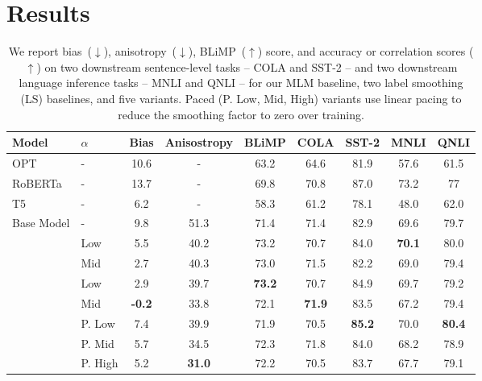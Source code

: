 \section{Results}
\label{sec:results}

\begin{table}[ht!]
    \centering
    \small
    \setlength{\tabcolsep}{4pt}  %
    \begin{tabular}{ll||cc|ccccc}
    \toprule
    \textbf{Model}  & $\alpha$ & \textbf{Bias}  & \textbf{Anisostropy} & \textbf{BLiMP} & \textbf{COLA} & \textbf{SST-2} & \textbf{MNLI} & \textbf{QNLI}  \\
    \midrule
    OPT   & - & 10.6 & - & 63.2 & 64.6 & 81.9 & 57.6 & 61.5\\
    RoBERTa & - & 13.7 & - & 69.8 & 70.8 & 87.0 & 73.2 & 77\\
    T5      & - & 6.2 & - & 58.3 & 61.2 & 78.1 & 48.0 &  62.0\\
    \midrule
    \midrule
    Base Model & -&9.8 & 51.3 & 71.4 & 71.4 & 82.9 & 69.6 & 79.7 \\
    \midrule
     &Low & 5.5 & 40.2 & 73.2 & 70.7 & 84.0 & \textbf{70.1} & 80.0 \\
    &Mid & 2.7  & 40.3 & 73.0 & 71.5 & 82.2 & 69.0 & 79.4 \\
    \midrule
    &Low  & 2.9 & 39.7 & \textbf{73.2} & 70.7 & 84.9 & 69.7 & 79.2 \\
    &Mid  & \textbf{-0.2} & 33.8 & 72.1 & \textbf{71.9} & 83.5 & 67.2 & 79.4 \\
    &P. Low & 7.4 & 39.9 & 71.9 & 70.5 & \textbf{85.2} & 70.0 & \textbf{80.4}\\ 
    &P. Mid& 5.7 & 34.5 & 72.3 & 71.8 & 84.0 & 68.2 & 78.9\\ 
    &P. High & 5.2 & \textbf{31.0} & 72.2 & 70.5 & 83.7 & 67.7 & 79.1 \\ 
    \bottomrule
    \end{tabular}
    \caption{\label{tbl:full-results} We report bias~($\downarrow$), anisotropy~($\downarrow$), BLiMP~($\uparrow$) score, and accuracy or correlation scores ($\uparrow$) on two downstream sentence-level tasks -- COLA and SST-2 -- and two downstream language inference tasks -- MNLI and QNLI -- for our MLM baseline, two label smoothing (LS) baselines, and five \smoothing variants. Paced (P. Low, Mid, High) variants use linear pacing to reduce the smoothing factor to zero over training.}
\end{table}

